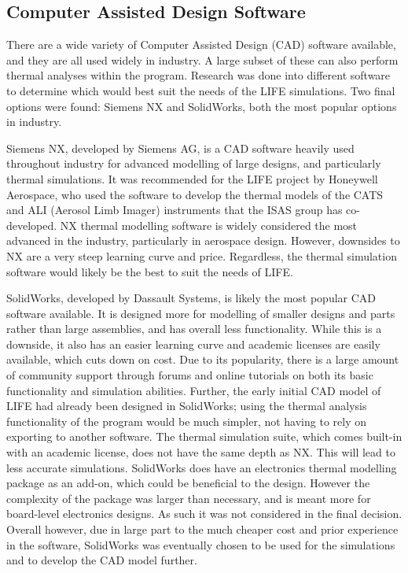 \subsection{Computer Assisted Design Software}
There are a wide variety of Computer Assisted Design (CAD) software available, and they are all used widely in industry. A large subset of these can also perform thermal analyses within the program. Research was done into different software to determine which would best suit the needs of the LIFE simulations. Two final options were found: Siemens NX and SolidWorks, both the most popular options in industry.

Siemens NX, developed by Siemens AG, is a CAD software heavily used throughout industry for advanced modelling of large designs, and particularly thermal simulations. It was recommended for the LIFE project by Honeywell Aerospace, who used the software to develop the thermal models of the CATS and ALI (Aerosol Limb Imager) instruments that the ISAS group has co-developed. NX thermal modelling software is widely considered the most advanced in the industry, particularly in aerospace design. However, downsides to NX are a very steep learning curve and price. Regardless, the thermal simulation software would likely be the best to suit the needs of LIFE.

SolidWorks, developed by Dassault Systems, is likely the most popular CAD software available. It is designed more for modelling of smaller designs and parts rather than large assemblies, and has overall less functionality. While this is a downside, it also has an easier learning curve and academic licenses are easily available, which cuts down on cost. Due to its popularity, there is a large amount of community support through forums and online tutorials on both its basic functionality and simulation abilities. Further, the early initial CAD model of LIFE had already been designed in SolidWorks; using the thermal analysis functionality of the program would be much simpler, not having to rely on exporting to another software. The thermal simulation suite, which comes built-in with an academic license, does not have the same depth as NX. This will lead to less accurate simulations. SolidWorks does have an electronics thermal modelling package as an add-on, which could be beneficial to the design. However the complexity of the package was larger than necessary, and is meant more for board-level electronics designs. As such it was not considered in the final decision. Overall however, due in large part to the much cheaper cost and prior experience in the software, SolidWorks was eventually chosen to be used for the simulations and to develop the CAD model further. 

